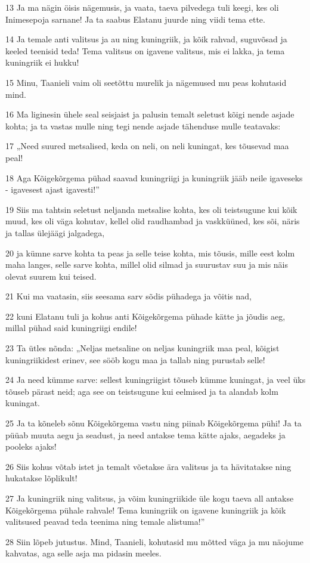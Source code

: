 \par 13 Ja ma nägin öisis nägemusis, ja vaata, taeva pilvedega tuli keegi, kes oli Inimesepoja sarnane! Ja ta saabus Elatanu juurde ning viidi tema ette.
\par 14 Ja temale anti valitsus ja au ning kuningriik, ja kõik rahvad, suguvõsad ja keeled teenisid teda! Tema valitsus on igavene valitsus, mis ei lakka, ja tema kuningriik ei hukku!
\par 15 Minu, Taanieli vaim oli seetõttu murelik ja nägemused mu peas kohutasid mind.
\par 16 Ma liginesin ühele seal seisjaist ja palusin temalt seletust kõigi nende asjade kohta; ja ta vastas mulle ning tegi nende asjade tähenduse mulle teatavaks:
\par 17 „Need suured metsalised, keda on neli, on neli kuningat, kes tõusevad maa peal!
\par 18 Aga Kõigekõrgema pühad saavad kuningriigi ja kuningriik jääb neile igaveseks - igavesest ajast igavesti!”
\par 19 Siis ma tahtsin seletust neljanda metsalise kohta, kes oli teistsugune kui kõik muud, kes oli väga kohutav, kellel olid raudhambad ja vaskküüned, kes sõi, näris ja tallas ülejäägi jalgadega,
\par 20 ja kümne sarve kohta ta peas ja selle teise kohta, mis tõusis, mille eest kolm maha langes, selle sarve kohta, millel olid silmad ja suurustav suu ja mis näis olevat suurem kui teised.
\par 21 Kui ma vaatasin, siis seesama sarv sõdis pühadega ja võitis nad,
\par 22 kuni Elatanu tuli ja kohus anti Kõigekõrgema pühade kätte ja jõudis aeg, millal pühad said kuningriigi endile!
\par 23 Ta ütles nõnda: „Neljas metsaline on neljas kuningriik maa peal, kõigist kuningriikidest erinev, see sööb kogu maa ja tallab ning purustab selle!
\par 24 Ja need kümme sarve: sellest kuningriigist tõuseb kümme kuningat, ja veel üks tõuseb pärast neid; aga see on teistsugune kui eelmised ja ta alandab kolm kuningat.
\par 25 Ja ta kõneleb sõnu Kõigekõrgema vastu ning piinab Kõigekõrgema pühi! Ja ta püüab muuta aegu ja seadust, ja need antakse tema kätte ajaks, aegadeks ja pooleks ajaks!
\par 26 Siis kohus võtab istet ja temalt võetakse ära valitsus ja ta hävitatakse ning hukatakse lõplikult!
\par 27 Ja kuningriik ning valitsus, ja võim kuningriikide üle kogu taeva all antakse Kõigekõrgema pühale rahvale! Tema kuningriik on igavene kuningriik ja kõik valitsused peavad teda teenima ning temale alistuma!”
\par 28 Siin lõpeb jutustus. Mind, Taanieli, kohutasid mu mõtted väga ja mu näojume kahvatas, aga selle asja ma pidasin meeles.

